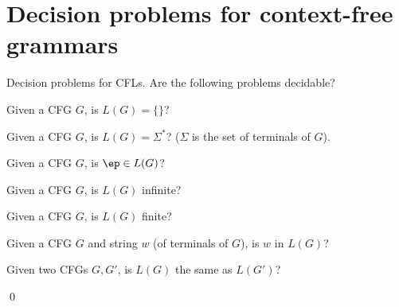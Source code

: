 \section{Decision problems for context-free grammars}

\begin{ex}
  Decision problems for CFLs.
  Are the following problems decidable?
  \begin{tightlist}
    \item Given a CFG $G$, is $L(G) = \{\}$?
    \item Given a CFG $G$, is $L(G) = \Sigma^*$? ($\Sigma$ is the
    set of terminals of $G$).
    \item Given a CFG $G$, is $\ep \in L(G)$?
    \item Given a CFG $G$, is $L(G)$ infinite?
    \item Given a CFG $G$, is $L(G)$ finite?
    \item Given a CFG $G$ and string $w$ (of terminals of $G$),
    is $w$ in $L(G)$?
    \item Given two CFGs $G, G'$, is $L(G)$ the same as $L(G')$?
  \end{tightlist}
  \qed
\end{ex}

